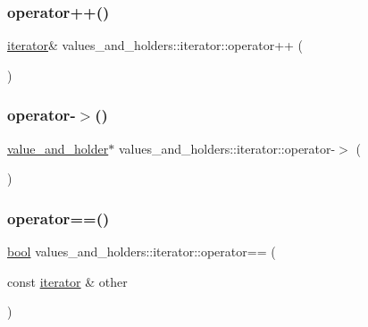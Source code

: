 \subsubsection{\texorpdfstring{operator++()}{operator++()}}
{\footnotesize\ttfamily \mbox{\hyperlink{structvalues__and__holders_1_1iterator}{iterator}}\& values\+\_\+and\+\_\+holders\+::iterator\+::operator++ (\begin{DoxyParamCaption}{ }\end{DoxyParamCaption})\hspace{0.3cm}{\ttfamily [inline]}}

\mbox{\label{structvalues__and__holders_1_1iterator_a0a40a308242db92fb8a847159a8a90ff}} 
\subsubsection{\texorpdfstring{operator-\/$>$()}{operator->()}}
{\footnotesize\ttfamily \mbox{\hyperlink{structvalue__and__holder}{value\+\_\+and\+\_\+holder}}$\ast$ values\+\_\+and\+\_\+holders\+::iterator\+::operator-\/$>$ (\begin{DoxyParamCaption}{ }\end{DoxyParamCaption})\hspace{0.3cm}{\ttfamily [inline]}}

\mbox{\label{structvalues__and__holders_1_1iterator_a33067e3338236631faabd163015ecdeb}} 
\subsubsection{\texorpdfstring{operator==()}{operator==()}}
{\footnotesize\ttfamily \mbox{\hyperlink{asdl_8h_af6a258d8f3ee5206d682d799316314b1}{bool}} values\+\_\+and\+\_\+holders\+::iterator\+::operator== (\begin{DoxyParamCaption}\item[{const \mbox{\hyperlink{structvalues__and__holders_1_1iterator}{iterator}} \&}]{other }\end{DoxyParamCaption})\hspace{0.3cm}{\ttfamily [inline]}}



